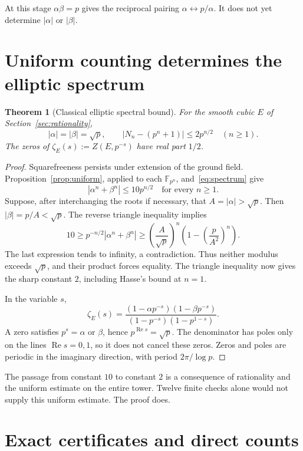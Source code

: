 \documentclass[11pt]{amsart}
\newtheorem{theorem}{Theorem}[section]
\theoremstyle{definition}
\theoremstyle{remark}
\newcommand{\F}{\mathbb F}
\renewcommand{\Re}{\operatorname{Re}}
\begin{document}
At this stage $\alpha\beta=p$ gives the reciprocal pairing $\alpha\leftrightarrow p/\alpha$. It does not yet determine $|\alpha|$ or $|\beta|$.

\section{Uniform counting determines the elliptic spectrum}\label{sec:spectral}

\begin{theorem}[Classical elliptic spectral bound]\label{thm:spectral}
For the smooth cubic $E$ of Section~\ref{sec:rationality},
\[
|\alpha|=|\beta|=\sqrt p,\qquad
|N_n-(p^n+1)|\le2p^{n/2}\quad(n\ge1).
\]
The zeros of $\zeta_E(s):=Z(E,p^{-s})$ have real part $1/2$.
\end{theorem}
\begin{proof}
Squarefreeness persists under extension of the ground field. Proposition~\ref{prop:uniform}, applied to each $\F_{p^n}$, and~\eqref{eq:spectrum} give
\[
|\alpha^n+\beta^n|\le10p^{n/2}\quad\text{for every }n\ge1.
\]
Suppose, after interchanging the roots if necessary, that $A=|\alpha|>\sqrt p$. Then $|\beta|=p/A<\sqrt p$. The reverse triangle inequality implies
\[
10\ge p^{-n/2}|\alpha^n+\beta^n|
 \ge\left(\frac A{\sqrt p}\right)^n
       \left(1-\left(\frac p{A^2}\right)^n\right).
\]
The last expression tends to infinity, a contradiction. Thus neither modulus exceeds $\sqrt p$, and their product forces equality. The triangle inequality now gives the sharp constant $2$, including Hasse's bound at $n=1$.

In the variable $s$,
\[
\zeta_E(s)=
 \frac{(1-\alpha p^{-s})(1-\beta p^{-s})}
      {(1-p^{-s})(1-p^{1-s})}.
\]
A zero satisfies $p^s=\alpha$ or $\beta$, hence $p^{\Re s}=\sqrt p$. The denominator has poles only on the lines $\Re s=0,1$, so it does not cancel these zeros. Zeros and poles are periodic in the imaginary direction, with period $2\pi/\log p$.
\end{proof}

The passage from constant $10$ to constant $2$ is a consequence of rationality and the uniform estimate on the entire tower. Twelve finite checks alone would not supply this uniform estimate. The proof does.

\section{Exact certificates and direct counts}\label{sec:certificates}
\end{document}
